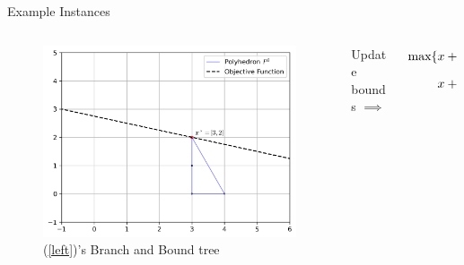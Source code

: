 \documentclass[final]{beamer}
\newlength{\colwidth}
\begin{document}
\begin{frame}[t]
\begin{columns}[t]
\begin{column}{\colwidth}
\begin{block}{Example Instances}
\begin{columns}[T]
\begin{column}{0.45\textwidth}
\begin{figure}[]
    			\hfill
    			\includegraphics[width=.45\textwidth]{P2.png}
    			\caption{(\ref{left})'s Branch and Bound tree}
    			\label{p:before}
    		\end{figure}
    	\end{column}
    	\begin{column}{0.10\textwidth}
    		\vspace{7.5cm}
    		\centering
    		Update bounds $ \implies $
    	\end{column}
    	\begin{column}{0.45\textwidth}
    		\begin{align}
    			\begin{split}
    				\text{max} \{ &x + 4y : -\frac{x}{2} + y \leq 3, \\
    				&x + \frac{y}{2} \leq 5, (x, y) \in \mathbb{Z}^2_+ \} 
    			\end{split}
    			\label{right}
    		\end{align}
    		\begin{figure}[h]

\end{figure}
\end{column}
\end{columns}
\end{block}
\end{column}
\end{columns}
\end{frame}
\end{document}
